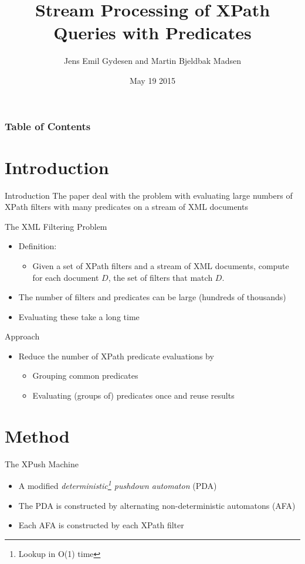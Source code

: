 \documentclass[mathserif,serif]{beamer}
\title{\large Stream Processing of XPath Queries with Predicates}
\author{Jens Emil Gydesen and Martin Bjeldbak Madsen}
\date{May 19 2015}
\begin{document}
\frame{\titlepage}

\begin{frame}
  \frametitle{Table of Contents}
  \tableofcontents[hideallsubsections]
\end{frame}


\section{Introduction}
\begin{frame}{Introduction}
  The paper deal with the problem with evaluating large numbers of XPath filters with many predicates on a stream of XML documents
\end{frame}

\begin{frame}{The XML Filtering Problem}
  \begin{itemize}
    \item Definition:
    \begin{itemize}
      \item Given a set of XPath filters and a stream of XML documents, compute for each document $D$, the set of filters that match $D$.
    \end{itemize}
    \item The number of filters and predicates can be large (hundreds of thousands)
    \item Evaluating these take a long time
  \end{itemize}
\end{frame}

\begin{frame}{Approach}
  \begin{itemize}
    \item Reduce the number of XPath predicate evaluations by
    \begin{itemize}
      \item Grouping common predicates 
      \item Evaluating (groups of) predicates once and reuse results
    \end{itemize}
  \end{itemize}
\end{frame}

\section{Method}
\begin{frame}{The XPush Machine}
  \begin{itemize}
    \item A modified \emph{deterministic\footnote{Lookup in O(1) time} pushdown automaton} (PDA)
    \item The PDA is constructed by alternating non-deterministic automatons (AFA)
    \item Each AFA is constructed by each XPath filter
  \end{itemize}
\end{frame}
\end{document}
